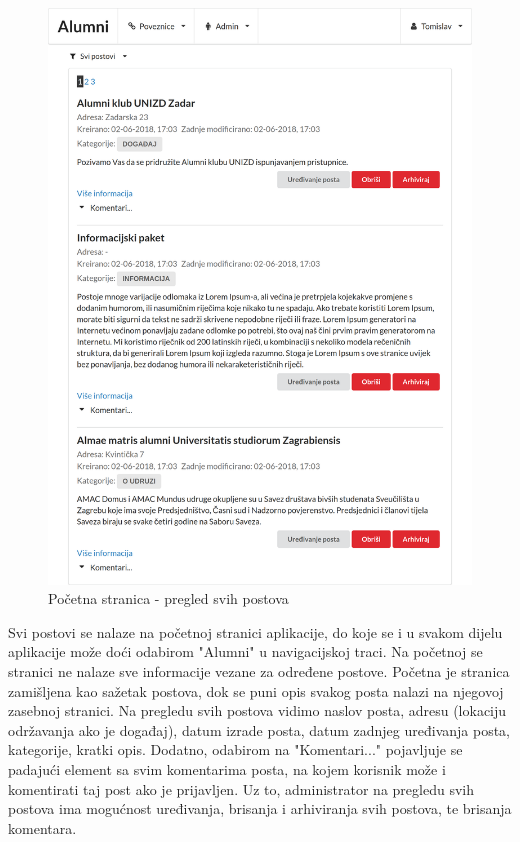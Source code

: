 \documentclass[zavrsni, numeric]{fer}
\begin{document}
\begin{figure}[H]
	\centering
	\includegraphics[width=13cm]{slike/postovi.png}
	\caption{Početna stranica - pregled svih postova}
	\label{fig:postovi}
\end{figure}

Svi postovi se nalaze na početnoj stranici aplikacije, do koje se i u svakom dijelu aplikacije može doći odabirom "Alumni" u navigacijskoj traci. Na početnoj se stranici ne nalaze sve informacije vezane za određene postove. Početna je stranica zamišljena kao sažetak postova, dok se puni opis svakog posta nalazi na njegovoj zasebnoj stranici. Na pregledu svih postova vidimo naslov posta, adresu (lokaciju održavanja ako je događaj), datum izrade posta, datum zadnjeg uređivanja posta, kategorije, kratki opis. Dodatno, odabirom na "Komentari..." pojavljuje se padajući element sa svim komentarima posta, na kojem korisnik može i komentirati taj post ako je prijavljen. Uz to, administrator na pregledu svih postova ima mogućnost uređivanja, brisanja i arhiviranja svih postova, te brisanja komentara. 
\end{document}
